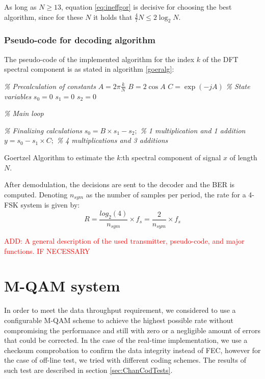 \documentclass[12pt,a4paper,openright]{report}
\begin{document}
As long as $N\geq 13$, equation \ref{eq:ineffgor} is decisive for choosing the best algorithm, since for these $N$ it holds that $\frac{4}{7} N \leq 2 \log_2 N$.

\subsubsection{Pseudo-code for decoding algorithm}
The pseudo-code of the implemented algorithm for the index $k$ of the DFT spectral component is as stated in algorithm \ref{goeralg}:  \\

\begin{algorithm}[H]
\BlankLine
\emph{\% Precalculation of constants}\;
$A= 2\pi \frac{k}{N}$\;
$B = 2\cos{A}$\;
$C = \exp{(-jA)}$\;
\emph{\% State variables}\;
$s_0=0$\;
$s_1=0$\;
$s_2=0$\;

\emph{\% Main loop}\;

\emph{\% Finalizing calculations}\;
$s_0 = B\times s_1 - s_2; $ \emph{\% 1 multiplication and 1 addition}\;
$y = s_0 -s_1 \times C; $  \emph{\% 4 multiplications and 3 additions}\;
\BlankLine
\BlankLine
\caption{Goertzel Algorithm to estimate the $k$:th spectral component of signal $x$ of length $N$.}
\label{goeralg}
\end{algorithm}


After demodulation, the decisions are sent to the decoder and the BER is computed. Denoting $n_{sym}$ as the number of samples per period, the rate for a 4-FSK system is given by:
\begin{equation}
R = \frac{log_2(4)}{n_{sym}}\times f_s = \frac{2}{n_{sym}}\times f_s 
\end{equation}

\textcolor{red}{ADD: A general description of the used transmitter, pseudo-code, and major functions. IF NECESSARY}%
\clearpage


\section{M-QAM system}
In order to meet the data throughput requirement, we considered to use a configurable M-QAM scheme to achieve the highest possible rate without compromising the performance and still with zero or a negligible amount of errors that could be corrected. In the case of the real-time implementation, we use a checksum comprobation to confirm the data integrity instead of FEC, however for the case of off-line test, we tried with different coding schemes. The results of such test are described in section \ref{sec:ChanCodTests}.
\end{document}
